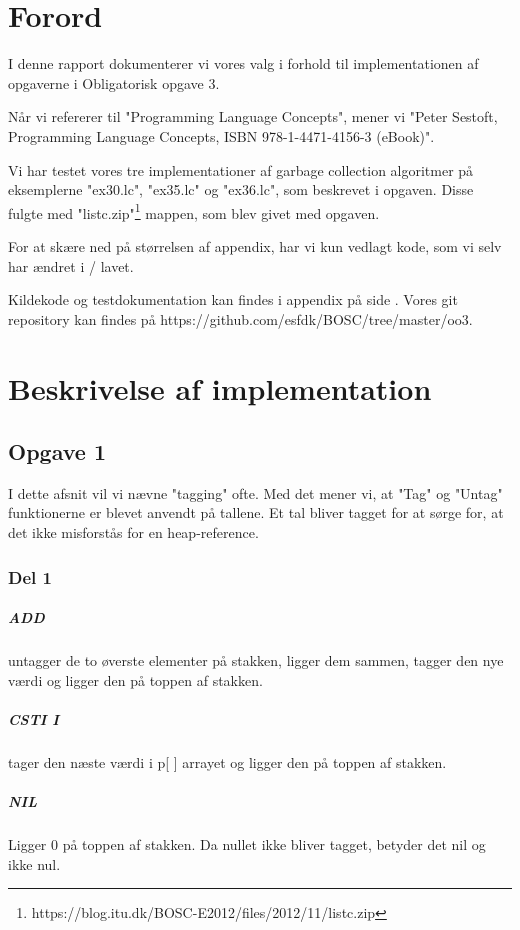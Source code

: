 \chapter{Forord}
I denne rapport dokumenterer vi vores valg i forhold til implementationen af opgaverne i Obligatorisk opgave 3.

Når vi refererer til "Programming Language Concepts", mener vi "Peter Sestoft, Programming Language Concepts, ISBN 978-1-4471-4156-3 (eBook)".

Vi har testet vores tre implementationer af garbage collection algoritmer på eksemplerne "ex30.lc", "ex35.lc" og "ex36.lc", som beskrevet i opgaven. Disse fulgte med "listc.zip"\footnote{https://blog.itu.dk/BOSC-E2012/files/2012/11/listc.zip} mappen, som blev givet med opgaven. 

For at skære ned på størrelsen af appendix, har vi kun vedlagt kode, som vi selv har ændret i / lavet.

Kildekode og testdokumentation kan findes i appendix på side \pageref{Appendix}. Vores git repository kan findes på https://github.com/esfdk/BOSC/tree/master/oo3.

\chapter{Beskrivelse af implementation}
\section{Opgave 1}
\label{O1}
I dette afsnit vil vi nævne "tagging" ofte. Med det mener vi, at "Tag" og "Untag" funktionerne er blevet anvendt på tallene. Et tal bliver tagget for at sørge for, at det ikke misforstås for en heap-reference.
\subsection{Del 1}
\label{O1_1}
\paragraph{ADD} untagger de to øverste elementer på stakken, ligger dem sammen, tagger den nye værdi og ligger den på toppen af stakken.
\paragraph{CSTI I} tager den næste værdi i p[ ] arrayet og ligger den på toppen af stakken.
\paragraph{NIL} Ligger 0 på toppen af stakken. Da nullet ikke bliver tagget, betyder det nil og ikke nul.
